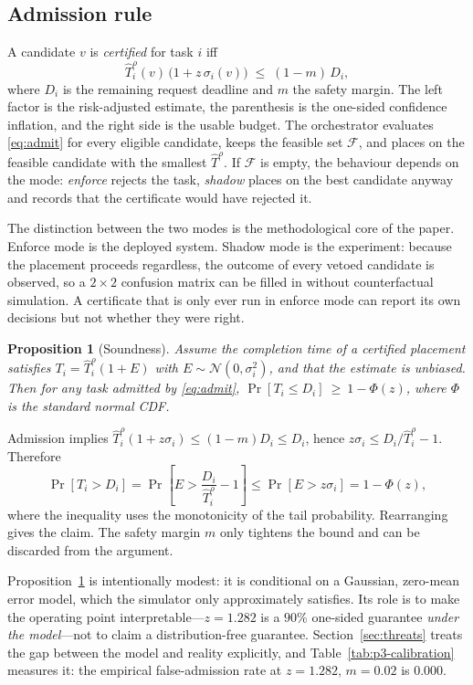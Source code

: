 \documentclass[journal,10pt]{IEEEtran}
\newtheorem{proposition}{Proposition}
\newcommand{\T}{\ensuremath{\hat{T}}}
\newcommand{\sig}{\ensuremath{\sigma}}
\begin{document}
\subsection{Admission rule}
A candidate $v$ is \emph{certified} for task $i$ iff
\begin{equation}
\T^{\rho}_i(v)\,\bigl(1+z\,\sig_i(v)\bigr)\;\le\;(1-m)\,D_i,
\label{eq:admit}
\end{equation}
where $D_i$ is the remaining request deadline and $m$ the safety margin. The
left factor is the risk-adjusted estimate, the parenthesis is the one-sided
confidence inflation, and the right side is the usable budget. The orchestrator
evaluates \eqref{eq:admit} for every eligible candidate, keeps the feasible
set $\mathcal{F}$, and places on the feasible candidate with the smallest
$\T^{\rho}$. If $\mathcal{F}$ is empty, the behaviour depends on the mode:
\emph{enforce} rejects the task, \emph{shadow} places on the best candidate
anyway and records that the certificate would have rejected it.

The distinction between the two modes is the methodological core of the paper.
Enforce mode is the deployed system. Shadow mode is the experiment: because the
placement proceeds regardless, the outcome of every vetoed candidate is
observed, so a $2\times2$ confusion matrix can be filled in without
counterfactual simulation. A certificate that is only ever run in enforce mode
can report its own decisions but not whether they were right.

\begin{proposition}[Soundness]
\label{prop:sound}
Assume the completion time of a certified placement satisfies
$T_i=\T^{\rho}_i(1+E)$ with $E\sim\mathcal{N}(0,\sig_i^2)$, and that the estimate
is unbiased. Then for any task admitted by \eqref{eq:admit},
$\Pr[T_i\le D_i]\ \ge\ 1-\Phi(z)$, where $\Phi$ is the standard normal CDF.
\end{proposition}

\begin{IEEEproof}
Admission implies $\T^{\rho}_i(1+z\sig_i)\le(1-m)D_i\le D_i$, hence
$z\sig_i\le D_i/\T^{\rho}_i-1$. Therefore
\[
\Pr[T_i>D_i]
=\Pr\!\left[E>\frac{D_i}{\T^{\rho}_i}-1\right]
\le \Pr[E>z\sig_i]
=1-\Phi(z),
\]
where the inequality uses the monotonicity of the tail probability. Rearranging
gives the claim. The safety margin $m$ only tightens the bound and can be
discarded from the argument.
\end{IEEEproof}

Proposition~\ref{prop:sound} is intentionally modest: it is conditional on a
Gaussian, zero-mean error model, which the simulator only approximately
satisfies. Its role is to make the operating point interpretable---$z=1.282$ is
a $90\%$ one-sided guarantee \emph{under the model}---not to claim a
distribution-free guarantee. Section~\ref{sec:threats} treats the gap between
the model and reality explicitly, and Table~\ref{tab:p3-calibration} measures
it: the empirical false-admission rate at $z=1.282$, $m=0.02$ is $0.000$.
\end{document}
